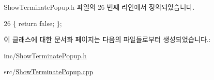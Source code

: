 Show\+Terminate\+Popup.\+h 파일의 26 번째 라인에서 정의되었습니다.


\begin{DoxyCode}
26 \{ \textcolor{keywordflow}{return} \textcolor{keyword}{false}; \};
\end{DoxyCode}


이 클래스에 대한 문서화 페이지는 다음의 파일들로부터 생성되었습니다.\+:\begin{DoxyCompactItemize}
\item 
inc/\hyperlink{_show_terminate_popup_8h}{Show\+Terminate\+Popup.\+h}\item 
src/\hyperlink{_show_terminate_popup_8cpp}{Show\+Terminate\+Popup.\+cpp}\end{DoxyCompactItemize}
